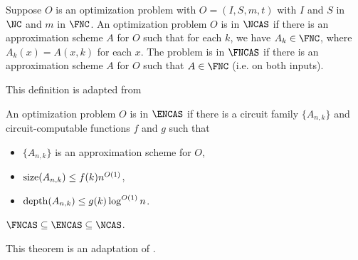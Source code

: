 \begin{definition}
  Suppose $O$ is an optimization problem with $O = (I, S, m, t)$ with $I$ and $S$ in $\NC$ and $m$ in $\FNC$.
  An optimization problem $O$ is in $\NCAS$ if there is an approximation scheme $A$ for $O$ such that for each $k$, we have $A_k \in \FNC$, where $A_k(x) = A(x, k)$ for each $x$.
  The problem is in $\FNCAS$ if there is an approximation scheme $A$ for $O$ such that $A \in \FNC$ (i.e. on both inputs).
\end{definition}

This definition is adapted from \autocite[Definition~1.31]{fg06}

\begin{definition}
  An optimization problem $O$ is in $\ENCAS$ if there is a circuit family $\{A_{n, k}\}$ and circuit-computable functions $f$ and $g$ such that
  \begin{itemize}
  \item $\{A_{n, k}\}$ is an approximation scheme for $O$,
  \item $\operatorname{size}(A_{n, k}) \leq f(k) n^{O(1)}$,
  \item $\operatorname{depth}(A_{n, k}) \leq g(k) \log^{O(1)} n$.
  \end{itemize}
\end{definition}

\begin{proposition}\label{prop:encas}
  $\FNCAS \subseteq \ENCAS \subseteq \NCAS$.
\end{proposition}


This theorem is an adaptation of \autocite[Theorem~1.32]{fg06}.

